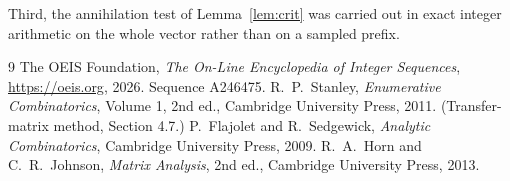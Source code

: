 \documentclass[11pt,a4paper]{article}
\theoremstyle{plain}
\theoremstyle{definition}
\begin{document}
Third, the annihilation test of Lemma~\ref{lem:crit} was carried out in exact integer
arithmetic on the whole vector rather than on a sampled prefix.

\begin{thebibliography}{9}
 The OEIS Foundation, \emph{The On-Line Encyclopedia of Integer
Sequences}, \url{https://oeis.org}, 2026. Sequence A246475.
 R.~P.~Stanley, \emph{Enumerative Combinatorics}, Volume 1, 2nd ed.,
Cambridge University Press, 2011. (Transfer-matrix method, Section 4.7.)
 P.~Flajolet and R.~Sedgewick, \emph{Analytic Combinatorics}, Cambridge
University Press, 2009.
 R.~A.~Horn and C.~R.~Johnson, \emph{Matrix Analysis}, 2nd ed., Cambridge
University Press, 2013.
\end{thebibliography}
\end{document}
